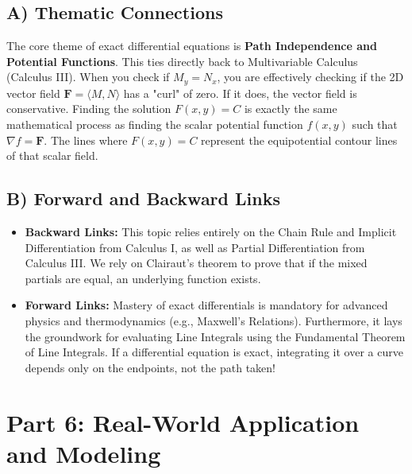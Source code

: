 \documentclass[11pt]{article}
\begin{document}
\subsection{A) Thematic Connections}
The core theme of exact differential equations is \textbf{Path Independence and Potential Functions}. This ties directly back to Multivariable Calculus (Calculus III). 
When you check if $M_y = N_x$, you are effectively checking if the 2D vector field $\mathbf{F} = \langle M, N \rangle$ has a "curl" of zero. If it does, the vector field is conservative. 
Finding the solution $F(x,y) = C$ is exactly the same mathematical process as finding the scalar potential function $f(x,y)$ such that $\nabla f = \mathbf{F}$. The lines where $F(x,y) = C$ represent the equipotential contour lines of that scalar field.

\subsection{B) Forward and Backward Links}
\begin{itemize}
    \item \textbf{Backward Links:} This topic relies entirely on the Chain Rule and Implicit Differentiation from Calculus I, as well as Partial Differentiation from Calculus III. We rely on Clairaut's theorem to prove that if the mixed partials are equal, an underlying function exists.
    \item \textbf{Forward Links:} Mastery of exact differentials is mandatory for advanced physics and thermodynamics (e.g., Maxwell's Relations). Furthermore, it lays the groundwork for evaluating Line Integrals using the Fundamental Theorem of Line Integrals. If a differential equation is exact, integrating it over a curve depends only on the endpoints, not the path taken!
\end{itemize}

\newpage
\section{Part 6: Real-World Application and Modeling}
\end{document}
